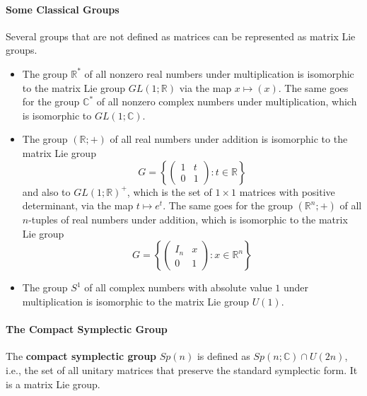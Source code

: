\documentclass[../main.tex]{subfiles}
\begin{document}
\paragraph{Some Classical Groups}
Several groups that are not defined as matrices can be represented as matrix Lie groups.
\begin{itemize}
	\item The group $\mathbb{R}^*$ of all nonzero real numbers under multiplication is isomorphic to the matrix Lie group $GL(1;\mathbb{R})$ via the map $x \mapsto (x)$. The same goes for the group $\mathbb{C}^*$ of all nonzero complex numbers under multiplication, which is isomorphic to $GL(1;\mathbb{C})$.
	\item The group $(\mathbb{R};+)$ of all real numbers under addition is isomorphic to the matrix Lie group
	      \begin{equation*}
		      G = \left\{ \begin{pmatrix}
			      1 & t \\
			      0 & 1
		      \end{pmatrix} : t \in \mathbb{R} \right\}
	      \end{equation*}
	      and also to $GL(1;\mathbb{R})^+$, which is the set of $1 \times 1$ matrices with positive determinant, via the map $t \mapsto e^t$. The same goes for the group $(\mathbb{R}^n; +)$ of all $n$-tuples of real numbers under addition, which is isomorphic to the matrix Lie group
	      \begin{equation*}
		      G = \left\{ \begin{pmatrix}
			      I_n & x \\
			      0   & 1
		      \end{pmatrix} : x \in \mathbb{R}^n \right\}
	      \end{equation*}
	\item The group $S^1$ of all complex numbers with absolute value $1$ under multiplication is isomorphic to the matrix Lie group $U(1)$.
\end{itemize}

\paragraph{The Compact Symplectic Group}
The \textbf{compact symplectic group} $Sp(n)$ is defined as $Sp(n;\mathbb{C}) \cap U(2n)$, i.e., the set of all unitary matrices that preserve the standard symplectic form. It is a matrix Lie group.
\end{document}
